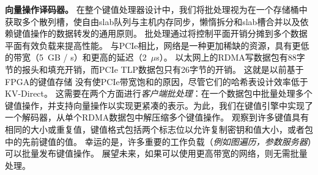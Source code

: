 
\textbf{向量操作译码器。}
在整个键值处理器设计中，我们将批处理视为在一个存储桶中获取多个散列槽，使自由slab队列与主机内存同步，懒惰拆分和slab槽合并以及依赖键值操作的数据转发的通用原则。
批处理通过将控制平面开销分摊到多个数据平面有效负载来提高性能。
与PCIe相比，网络是一种更加稀缺的资源，具有更低的带宽（5~GB / s）和更高的延迟（2~$\mu$s）。
以太网上的RDMA写数据包有88字节的报头和填充开销，而PCIe TLP数据包只有26字节的开销。
这就是以前基于FPGA的键值存储 \cite{blott13hotcloud,blott2015scaling} 没有使PCIe带宽饱和的原因，尽管它们的哈希表设计效率低于KV-Direct。
这需要在两个方面进行\textit {客户端批处理}：在一个数据包中批量处理多个键值操作，并支持向量操作以实现更紧凑的表示。为此，我们在键值引擎中实现了一个解码器，从单个RDMA数据包中解压缩多个键值操作。
观察到许多键值具有相同的大小或重复值，键值格式包括两个标志位以允许复制密钥和值大小，或者包中的先前键值的值。
幸运的是，许多重要的工作负载（\textit {例如图遍历，参数服务器}）可以批量发布键值操作。
展望未来，如果可以使用更高带宽的网络，则无需批量处理。
